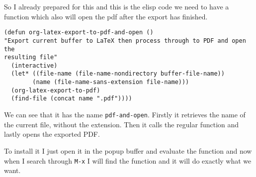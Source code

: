 \documentclass[11pt]{article}
\begin{document}
So I already prepared for this and this is the elisp code we need to have a
function which also will open the pdf after the export has finished.

\begin{verbatim}
(defun org-latex-export-to-pdf-and-open ()
"Export current buffer to LaTeX then process through to PDF and open the
resulting file"
  (interactive)
  (let* ((file-name (file-name-nondirectory buffer-file-name))
        (name (file-name-sans-extension file-name)))
  (org-latex-export-to-pdf)
  (find-file (concat name ".pdf"))))
\end{verbatim}

We can see that it has the name \texttt{pdf-and-open}. Firstly it retrieves the name of
the current file, without the extension. Then it calls the regular function and
lastly opens the exported PDF.

To install it I just open it in the popup buffer and evaluate the function and
now when I search through \texttt{M-x} I will find the function and it will do exactly
what we want.
\end{document}
